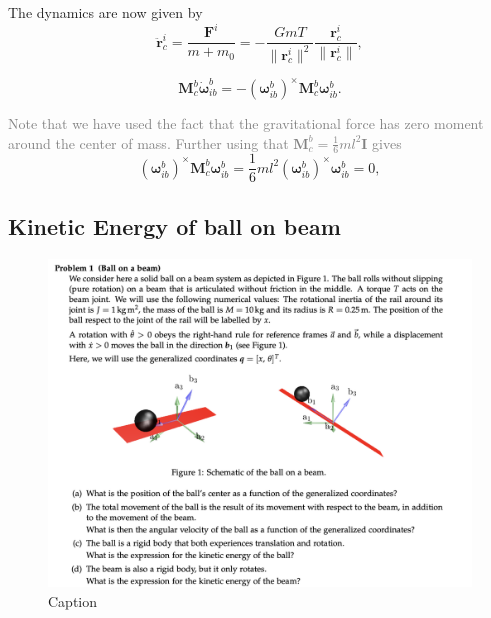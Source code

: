 The dynamics are now given by
\begin{equation}
    \ddot{\mathbf{r}}_c^i = \frac{\mathbf{F}^i}{m + m_0} = -\frac{G m T}{\|\mathbf{r}_c^i\|^2} \frac{\mathbf{r}_c^i}{\|\mathbf{r}_c^i\|},
\end{equation}

\begin{equation}
    \mathbf{M}_c^b \dot{\boldsymbol{\omega}}_{ib}^b = -\left( \boldsymbol{\omega}_{ib}^b \right)^\times \mathbf{M}_c^b \boldsymbol{\omega}_{ib}^b.
\end{equation}

\textcolor{gray}{Note that we have used the fact that the gravitational force has zero moment around the center of mass. Further using that $\mathbf{M}_c^b = \frac{1}{6} m l^2 \mathbf{I}$ gives}
\begin{equation}
    \left( \boldsymbol{\omega}_{ib}^b \right)^\times \mathbf{M}_c^b \boldsymbol{\omega}_{ib}^b = \frac{1}{6} m l^2 \left( \boldsymbol{\omega}_{ib}^b \right)^\times \boldsymbol{\omega}_{ib}^b = 0,
\end{equation}


\subsection{Kinetic Energy of ball on beam}

\begin{figure}[H]
    \centering
    \includegraphics[scale = 0.4]{Skjermbilde 2024-05-24 kl. 10.57.23.png}
    \caption{Caption}
    \label{fig:enter-label}
\end{figure}

